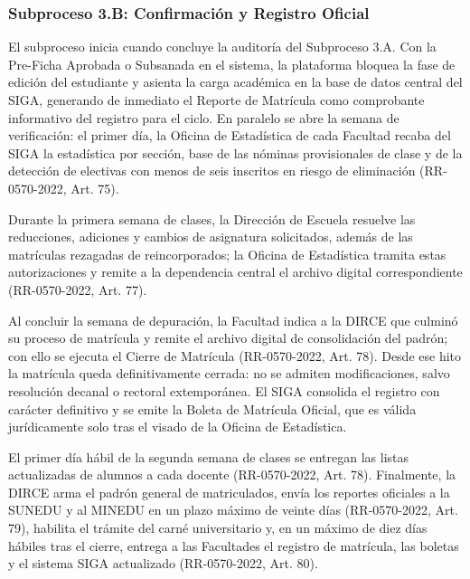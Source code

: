 \subsubsection{Subproceso 3.B: Confirmación y Registro Oficial}

El subproceso inicia cuando concluye la auditor\'ia del Subproceso 3.A. Con la Pre-Ficha Aprobada o Subsanada en el sistema, la plataforma bloquea la fase de edici\'on del estudiante y asienta la carga acad\'emica en la base de datos central del SIGA, generando de inmediato el Reporte de Matr\'icula como comprobante informativo del registro para el ciclo. En paralelo se abre la semana de verificaci\'on: el primer d\'ia, la Oficina de Estad\'istica de cada Facultad recaba del SIGA la estad\'istica por secci\'on, base de las n\'ominas provisionales de clase y de la detecci\'on de electivas con menos de seis inscritos en riesgo de eliminaci\'on (RR-0570-2022, Art. 75\textdegree{}).

Durante la primera semana de clases, la Direcci\'on de Escuela resuelve las reducciones, adiciones y cambios de asignatura solicitados, adem\'as de las matr\'iculas rezagadas de reincorporados; la Oficina de Estad\'istica tramita estas autorizaciones y remite a la dependencia central el archivo digital correspondiente (RR-0570-2022, Art. 77\textdegree{}).

Al concluir la semana de depuraci\'on, la Facultad indica a la DIRCE que culmin\'o su proceso de matr\'icula y remite el archivo digital de consolidaci\'on del padr\'on; con ello se ejecuta el Cierre de Matr\'icula (RR-0570-2022, Art. 78\textdegree{}). Desde ese hito la matr\'icula queda definitivamente cerrada: no se admiten modificaciones, salvo resoluci\'on decanal o rectoral extempor\'anea. El SIGA consolida el registro con car\'acter definitivo y se emite la Boleta de Matr\'icula Oficial, que es v\'alida jur\'idicamente solo tras el visado de la Oficina de Estad\'istica.

El primer día hábil de la segunda semana de clases se entregan las listas actualizadas de alumnos a cada docente (RR-0570-2022, Art. 78\textdegree{}). Finalmente, la DIRCE arma el padrón general de matriculados, envía los reportes oficiales a la SUNEDU y al MINEDU en un plazo máximo de veinte días (RR-0570-2022, Art. 79\textdegree{}), habilita el trámite del carné universitario y, en un máximo de diez días hábiles tras el cierre, entrega a las Facultades el registro de matrícula, las boletas y el sistema SIGA actualizado (RR-0570-2022, Art. 80\textdegree{}).
